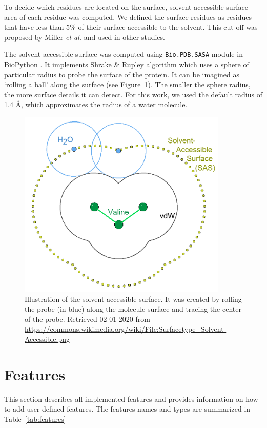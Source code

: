 To decide which residues are located on the surface, solvent-accessible surface area of each residue was computed. We defined the surface residues as residues that have less than 5\% of their surface accessible to the solvent. This cut-off was proposed by Miller \textit{et al.} \cite{sasaCutoff} and used in other studies\cite{jones,lbscomposition}. 

The solvent-accessible surface was computed using \texttt{Bio.PDB.SASA} module in BioPython \cite{sasa}. It implements Shrake \& Rupley algorithm \cite{shrake} which uses a sphere of particular radius to probe the surface of the protein. It can be imagined as `rolling a ball' along the surface (see Figure~\ref{fig:sasa}). The smaller the sphere radius, the more surface details it can detect. For this work, we used the default radius of 1.4 {\AA}, which approximates the radius of a water molecule.

\begin{figure}[!htbp]\centering
\includegraphics[width=100mm]{../img/sasa.png}
\caption[Illustration of the solvent accessible surface]{Illustration of the solvent accessible surface. It was created by rolling the probe (in blue) along the molecule surface and tracing the center of the probe. Retrieved 02-01-2020 from \url{https://commons.wikimedia.org/wiki/File:Surfacetype_Solvent-Accessible.png}}
\label{fig:sasa}
\end{figure}

\section{Features}

This section describes all implemented features and provides information on how to add user-defined features. The features names and types are summarized in Table~\ref{tab:features}


